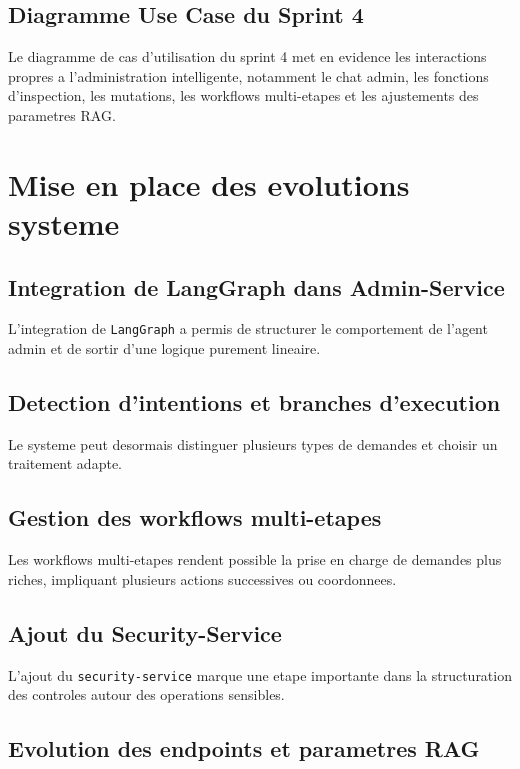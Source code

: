 \subsection{Diagramme Use Case du Sprint 4}

Le diagramme de cas d'utilisation du sprint 4 met en evidence les interactions propres a l'administration intelligente, notamment le chat admin, les fonctions d'inspection, les mutations, les workflows multi-etapes et les ajustements des parametres RAG.

\section{Mise en place des evolutions systeme}

\subsection{Integration de LangGraph dans Admin-Service}

L'integration de \texttt{LangGraph} a permis de structurer le comportement de l'agent admin et de sortir d'une logique purement lineaire.

\subsection{Detection d'intentions et branches d'execution}

Le systeme peut desormais distinguer plusieurs types de demandes et choisir un traitement adapte.

\subsection{Gestion des workflows multi-etapes}

Les workflows multi-etapes rendent possible la prise en charge de demandes plus riches, impliquant plusieurs actions successives ou coordonnees.

\subsection{Ajout du Security-Service}

L'ajout du \texttt{security-service} marque une etape importante dans la structuration des controles autour des operations sensibles.

\subsection{Evolution des endpoints et parametres RAG}

